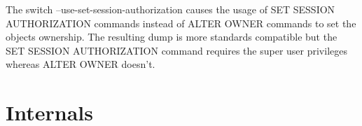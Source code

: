 The switch --use-set-session-authorization causes the usage of SET SESSION AUTHORIZATION 
commands instead of ALTER OWNER commands to set the objects ownership. The resulting dump is more 
standards compatible but the SET SESSION AUTHORIZATION command requires the super user privileges 
whereas ALTER OWNER doesn't.




\section{Internals}
\label{sec:PGDUMPINT}
